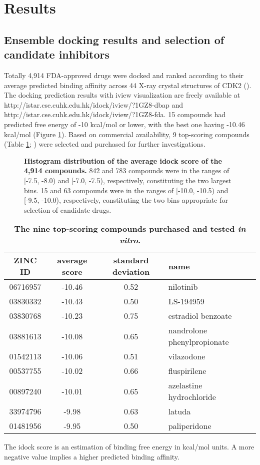 \documentclass[10pt,letterpaper]{article}
\begin{document}
\section*{Results}

\subsection*{Ensemble docking results and selection of candidate inhibitors}

Totally 4,914 FDA-approved drugs were docked and ranked according to their average predicted binding affinity across 44 X-ray crystal structures of CDK2 (). The docking prediction results with iview visualization \cite{1366} are freely available at http://istar.cse.cuhk.edu.hk/idock/iview/?1GZ8-dbap and http://istar.cse.cuhk.edu.hk/idock/iview/?1GZ8-fda. 15 compounds had predicted free energy of -10 kcal/mol or lower, with the best one having -10.46 kcal/mol (Figure \ref{AvgScoreHistogram}). Based on commercial availability, 9 top-scoring compounds (Table \ref{Top9}; ) were selected and purchased for further investigations.

\begin{figure}
\caption{{\bf Histogram distribution of the average idock score of the 4,914 compounds.} 842 and 783 compounds were in the ranges of [-7.5, -8.0) and [-7.0, -7.5), respectively, constituting the two largest bins. 15 and 63 compounds were in the ranges of [-10.0, -10.5) and [-9.5, -10.0), respectively, constituting the two bins appropriate for selection of candidate drugs.}
\label{AvgScoreHistogram}
\end{figure}

\begin{table}
\caption{
\bf{The nine top-scoring compounds purchased and tested \textit{in vitro}.}}
\begin{tabular}{cccl}
\hline
ZINC ID & average score & standard deviation & name\\
\hline
06716957 & -10.46 & 0.52 & nilotinib\\
03830332 & -10.43 & 0.50 & LS-194959\\
03830768 & -10.23 & 0.75 & estradiol benzoate\\
03881613 & -10.08 & 0.65 & nandrolone phenylpropionate\\
01542113 & -10.06 & 0.51 & vilazodone\\
00537755 & -10.02 & 0.66 & fluspirilene\\
00897240 & -10.01 & 0.65 & azelastine hydrochloride\\
33974796 &  -9.98 & 0.63 & latuda\\
01481956 &  -9.95 & 0.50 & paliperidone\\
\hline
\end{tabular}
\begin{flushleft} The idock score is an estimation of binding free energy in kcal/mol units. A more negative value implies a higher predicted binding affinity.
\end{flushleft}
\label{Top9}
\end{table}
\end{document}
